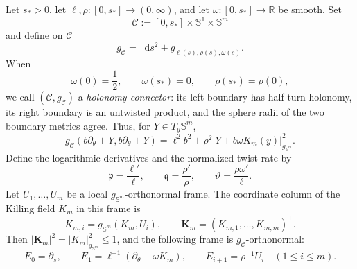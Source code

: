 \documentclass[11pt,reqno]{amsart}
\theoremstyle{definition}
\numberwithin{equation}{section}
\newcommand{\dd}{\mathop{}\!\mathrm d}
\begin{document}
Let \(s_*>0\), let \(\ell,\rho:[0,s_*]\to(0,\infty)\), and let
\(\omega:[0,s_*]\to\mathbb R\) be smooth.  Set
\[
 \mathcal C:=[0,s_*]\times\mathbb S^1\times\mathbb S^m
\]
and define on $\mathcal C$
\begin{equation}\label{eq:un-connector}
 g_{\mathcal C}=\dd s^2+g_{\ell(s),\rho(s),\omega(s)}.
\end{equation}
When
\[
 \omega(0)=\frac12,\qquad \omega(s_*)=0,
 \qquad \rho(s_*)=\rho(0),
\]
we call $(\mathcal C,g_{\mathcal C})$ a \emph{holonomy connector}: its
left boundary has half-turn holonomy, its right boundary is an untwisted
product, and the sphere radii of the two boundary metrics agree.
Thus, for \(Y\in T_y\mathbb S^m\),
\[
 g_{\mathcal C}(b\partial_\theta+Y,b\partial_\theta+Y)
 =\ell^2b^2+\rho^2
   \lvert Y+b\omega K_m(y)\rvert_{g_{\mathbb S^m}}^2.
\]
Define the logarithmic derivatives and the normalized twist rate by
\begin{equation}\label{eq:un-log-derivatives}
 \mathfrak p=\frac{\ell'}{\ell},
 \qquad \mathfrak q=\frac{\rho'}{\rho},
 \qquad \vartheta=\frac{\rho\omega'}{\ell}.
\end{equation}
Let \(U_1,\ldots,U_m\) be a local
\(g_{\mathbb S^m}\)-orthonormal frame.  The coordinate column of the
Killing field \(K_m\) in this frame is
\[
 K_{m,i}=g_{\mathbb S^m}(K_m,U_i),
 \qquad
 \mathbf K_m=(K_{m,1},\ldots,K_{m,m})^{\mathsf T}.
\]
Then
\(\lvert\mathbf K_m\rvert^2
=\lvert K_m\rvert_{g_{\mathbb S^m}}^2\le1\), and the following frame is
\(g_{\mathcal C}\)-orthonormal:
\begin{equation}\label{eq:un-adapted-frame}
 E_0=\partial_s,
 \qquad
 E_1=\ell^{-1}(\partial_\theta-\omega K_m),
 \qquad
 E_{i+1}=\rho^{-1}U_i\quad(1\le i\le m).
\end{equation}
\end{document}
